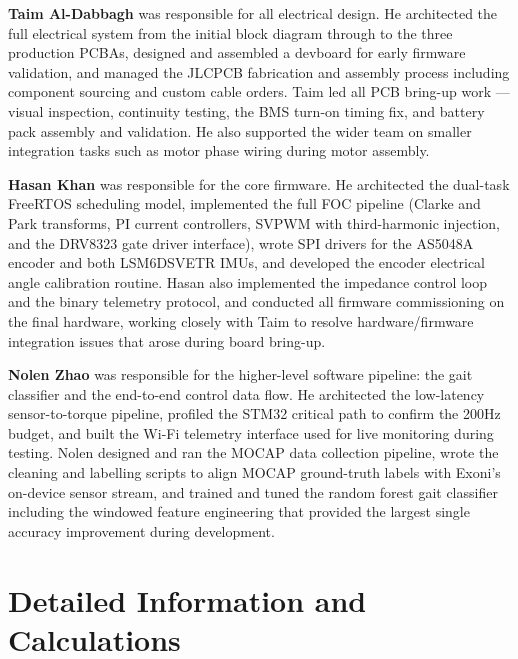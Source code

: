 \documentclass[11pt]{article}
\begin{document}
\textbf{Taim Al-Dabbagh} was responsible for all electrical design. He architected the full electrical system from the initial block diagram through to the three production PCBAs, designed and assembled a devboard for early firmware validation, and managed the JLCPCB fabrication and assembly process including component sourcing and custom cable orders. Taim led all PCB bring-up work --- visual inspection, continuity testing, the BMS turn-on timing fix, and battery pack assembly and validation. He also supported the wider team on smaller integration tasks such as motor phase wiring during motor assembly.

\textbf{Hasan Khan} was responsible for the core firmware. He architected the dual-task FreeRTOS scheduling model, implemented the full FOC pipeline (Clarke and Park transforms, PI current controllers, SVPWM with third-harmonic injection, and the DRV8323 gate driver interface), wrote SPI drivers for the AS5048A encoder and both LSM6DSVETR IMUs, and developed the encoder electrical angle calibration routine. Hasan also implemented the impedance control loop and the binary telemetry protocol, and conducted all firmware commissioning on the final hardware, working closely with Taim to resolve hardware/firmware integration issues that arose during board bring-up.

\textbf{Nolen Zhao} was responsible for the higher-level software pipeline: the gait classifier and the end-to-end control data flow. He architected the low-latency sensor-to-torque pipeline, profiled the STM32 critical path to confirm the 200Hz budget, and built the Wi-Fi telemetry interface used for live monitoring during testing. Nolen designed and ran the MOCAP data collection pipeline, wrote the cleaning and labelling scripts to align MOCAP ground-truth labels with Exoni's on-device sensor stream, and trained and tuned the random forest gait classifier including the windowed feature engineering that provided the largest single accuracy improvement during development.


\clearpage




\clearpage
\appendix

\section{Detailed Information and Calculations}
\end{document}
